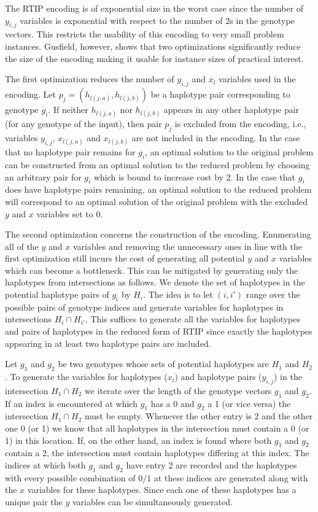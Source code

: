 \documentclass[12pt,a4paper]{article}
\begin{document}
The RTIP encoding is of exponential size in the worst case since  the number of $y_{i,j}$ variables is exponential with respect to the number of $2$s in the genotype vectors.
This restricts the usability of this encoding to very small problem instances.
Gusfield, however, shows that two optimizations significantly reduce the size of the encoding making it usable for instance sizes of practical interest.

The first optimization reduces the number of $y_{i,j}$ and $x_l$ variables used in the encoding.
Let $p_j=(h_{l(j,a)}, h_{l(j,b)})$ be a haplotype pair corresponding to genotype $g_i$.
If neither $h_{l(j,a)}$ nor $h_{l(j,b)}$ appears in any other haplotype pair (for any genotype of the input), 
then pair $p_j$ is excluded from the encoding, i.e., 
variables $y_{i,j}$, $x_{l(j,a)}$ and $x_{l(j,b)}$ are not included in the encoding.
In the case that no haplotype pair remains for $g_i$, an optimal solution to the original problem can be constructed from an optimal solution to the reduced problem by choosing an arbitrary pair for $g_i$ which is bound to increase cost by 2.
In the case that $g_i$ does have haplotype pairs remaining, an optimal solution to the reduced problem will correspond to an optimal solution of the original problem with the excluded $y$ and $x$ variables set to $0$.

The second optimization concerns the construction of the encoding.
Enumerating all of the $y$ and $x$ variables and removing the unnecessary ones in line with the first optimization still incurs the cost of generating all potential $y$ and $x$ variables which can become a bottleneck.
This can be mitigated by generating only the haplotypes from intersections as follows.
We denote the set of haplotypes in the potential haplotype pairs of $g_i$ by $H_i$.
The idea is to let $(i,i')$ range over the possible pairs of genotype indices and generate variables for haplotypes in intersections $H_i\cap H_{i'}$.
This suffices to generate all the variables for haplotypes and pairs of haplotypes in the reduced form of RTIP since exactly the haplotypes appearing in at least two haplotype pairs are included.

Let $g_1$ and $g_2$ be two genotypes whose sets of potential haplotypes are $H_1$ and $H_2$.
To generate the variables for haplotypes ($x_l$) and haplotype pairs ($y_{i,j}$) in the intersection $H_1\cap H_2$ we iterate over the length of the genotype vectors $g_1$ and $g_2$.
If an index is encountered at which $g_1$ has a 0 and $g_2$ a 1 (or vice versa) the intersection $H_1\cap H_2$ must be empty.
Whenever the other entry is 2 and the other one 0 (or 1) we know that all haplotypes in the intersection must contain a 0 (or 1) in this location.
If, on the other hand, an index is found where both $g_1$ and $g_2$ contain a 2, the intersection must contain haplotypes differing at this index.
The indices at which both $g_1$ and $g_2$ have entry 2 are recorded and the haplotypes with every possible combination of $0/1$ at these indices are generated along with the $x$ variables for these haplotypes.
Since each one of these haplotypes has a unique pair the $y$ variables can be simultaneously generated.
\end{document}
